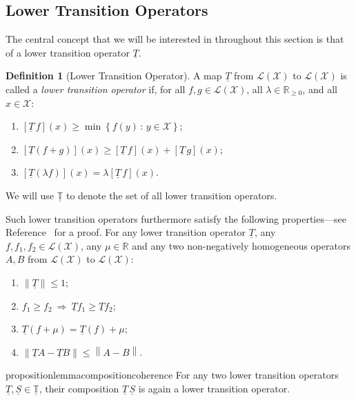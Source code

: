 \documentclass[10pt,a4paper]{paper}
\theoremstyle{definition}
\newtheorem{definition}{Definition}
\newcommand{\reals}{\mathbb{R}}
\newcommand{\realsnonneg}{\reals_{\geq 0}}
\newcommand{\states}{\mathcal{X}}
\newcommand{\lt}{\underline{T}}
\newcommand{\gambles}{\mathcal{L}}
\newcommand{\gamblesX}{\gambles(\states)}
\newcommand{\then}{\Rightarrow}
\newcommand{\norm}[1]{\left\lVert #1 \right\rVert}
\begin{document}
\subsection{Lower Transition Operators}\label{subsec:lowertrans_rate}

The central concept that we will be interested in throughout this section is that of a lower transition operator $\lt$.

\begin{definition}[Lower Transition Operator]\label{def:coh_low_trans}
A map $\lt$ from $\gamblesX$ to $\gamblesX$ is called a \emph{lower transition operator} if, for all $f,g\in\gamblesX$, all $\lambda\in\realsnonneg$, and all $x\in\states$:
\begin{enumerate}[label=LT\arabic*:,ref=LT\arabic*]
\item
$\left[\lt\,f\right](x)\geq\min\left\{f(y)\,\colon\,y\in\states\right\}$; \label{LT:bounded_min}
\item
$\left[\lt(f+g)\right](x)\geq \left[\lt\,f\right](x)+\left[\lt\,g\right](x)$; \label{LT:super_additive}
\item
$\left[\lt(\lambda f)\right](x)=\lambda\left[\lt\,f\right](x)$. \label{LT:homo}
\end{enumerate}
\noindent We will use $\underline{\mathbb{T}}$ to denote the set of all lower transition operators.


Such lower transition operators furthermore satisfy the following properties---see Reference~\cite{DeBock:2016} for a proof. For any lower transition operator $\lt$, any $f,f_1,f_2\in\gamblesX$, any $\mu\in\reals$ and any two non-negatively homogeneous operators $A,B$ from $\gamblesX$ to $\gamblesX$:
\begin{enumerate}[label=LT\arabic*:,ref=LT\arabic*,start=4]
\item
$\norm{\lt} \leq 1$; \label{LT:norm_at_most_one}
\item
$f_1\geq f_2~\then~\lt f_1\geq\lt f_2$;\label{LT:monotonicity}
\item
$\lt(f+\mu)=\lt(f)+\mu$;\label{LT:constantadditivity}
\item
$\norm{\lt A - \lt B} \leq \norm{A - B}$. \label{LT:differencenorm}
\end{enumerate}
\vspace{0pt}
\end{definition}

\begin{restatable}{proposition}{lemmacompositioncoherence}
\label{lemma:compositioncoherence}
For any two lower transition operators $\lt,\underline{S}\in\underline{\mathbb{T}}$, their composition $\lt\,\underline{S}$ is again a lower transition operator.%
\end{restatable}
\end{document}
